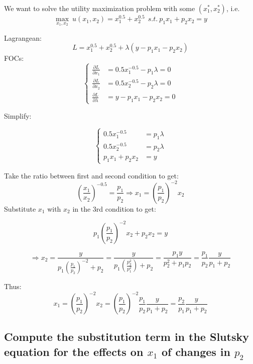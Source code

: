 \documentclass{article}
\begin{document}
We want to solve the utility maximization problem with some $(x_1^*, x_2^*)$, i.e.
$$\max_{x_1,x_2} \ u(x_1,x_2) = x_1^{0.5} + x_2^{0.5} \ \ s.t. \ p_1x_1 + p_2x_2 = y$$


Lagrangean: $$L = x_1^{0.5} + x_2^{0.5} + \lambda (y - p_1x_1 -p_2x_2)$$
FOCs:
\begin{equation}
\begin{cases}
\frac{\partial L}{\partial x_1} &= 0.5x_1^{-0.5} -p_1\lambda = 0 \\
\frac{\partial L}{\partial x_2} &= 0.5x_2^{-0.5} -p_2\lambda = 0 \\
\frac{\partial L}{\partial \lambda} &= y - p_1x_1 -p_2x_2 =0
\end{cases}
\nonumber
\end{equation}

Simplify:

\begin{equation}
\begin{cases}
0.5x_1^{-0.5} &= p_1\lambda \\
0.5x_2^{-0.5} &= p_2\lambda \\
p_1x_1 + p_2x_2 &= y
\end{cases}
\end{equation}

Take the ratio between first and second condition to get:
$$(\frac{x_1}{x_2})^{-0.5} = \frac{p_1}{p_2} \Rightarrow x_1 = (\frac{p_1}{p_2})^{-2}x_2 $$
Substitute $x_1$ with $x_2$ in the 3rd condition to get:

$$p_1(\frac{p_1}{p_2})^{-2}x_2 + p_2x_2 = y$$ 

$$\Rightarrow x_2 = \frac{y}{p_1(\frac{p_1}{p_2})^{-2} + p_2} = \frac{y}{p_1(\frac{p_2^2}{p_1^2}) + p_2} =\frac{p_1y}{p_2^2 + p_1p_2} = \frac{p_1}{p_2}\frac{y}{p_1 + p_2}$$

Thus:
$$x_1 = (\frac{p_1}{p_2})^{-2}x_2 = (\frac{p_1}{p_2})^{-2}\frac{p_1}{p_2}\frac{y}{p_1 + p_2} =\frac{p_2}{p_1}\frac{y}{p_1 + p_2}$$


\subsection{Compute the substitution term in the Slutsky equation for the effects on $x_1$ of changes in $p_2$}
\end{document}
